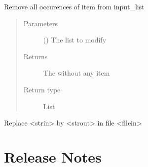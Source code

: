 \documentclass[a4paper,10pt,english]{sphinxmanual}
\begin{document}

\begin{fulllineitems}
\label{\detokenize{commands/apidoc/src:src.read_config_from_a_file}}
\end{fulllineitems}


\begin{fulllineitems}
\label{\detokenize{commands/apidoc/src:src.remove_item_from_list}}
Remove all occurences of item from input\_list
\begin{quote}\begin{description}
\item[{Parameters}] \leavevmode
{} () \textendash{} The list to modify

\item[{Returns}] \leavevmode
The without any item

\item[{Return type}] \leavevmode
List

\end{description}\end{quote}

\end{fulllineitems}


\begin{fulllineitems}
\label{\detokenize{commands/apidoc/src:src.replace_in_file}}
Replace \textless{}strin\textgreater{} by \textless{}strout\textgreater{} in file \textless{}filein\textgreater{}

\end{fulllineitems}



\chapter{Release Notes}
\label{\detokenize{index:release-notes}}
\end{document}
